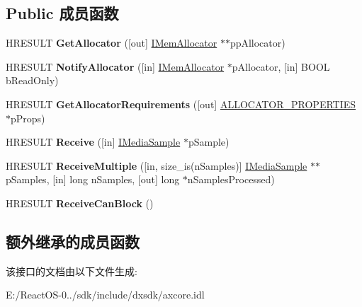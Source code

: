 \subsection*{Public 成员函数}
\begin{DoxyCompactItemize}
\item 
\mbox{\label{interface_i_mem_input_pin_aa7e262cdc9a877d4b41fb8381801115e}} 
H\+R\+E\+S\+U\+LT {\bfseries Get\+Allocator} (\mbox{[}out\mbox{]} \hyperlink{interface_i_mem_allocator}{I\+Mem\+Allocator} $\ast$$\ast$pp\+Allocator)
\item 
\mbox{\label{interface_i_mem_input_pin_a24dafe55e22f2a48f9328abf327162e7}} 
H\+R\+E\+S\+U\+LT {\bfseries Notify\+Allocator} (\mbox{[}in\mbox{]} \hyperlink{interface_i_mem_allocator}{I\+Mem\+Allocator} $\ast$p\+Allocator, \mbox{[}in\mbox{]} B\+O\+OL b\+Read\+Only)
\item 
\mbox{\label{interface_i_mem_input_pin_ae3a1a4054e8a289acf7630225b3a2657}} 
H\+R\+E\+S\+U\+LT {\bfseries Get\+Allocator\+Requirements} (\mbox{[}out\mbox{]} \hyperlink{struct___allocator_properties}{A\+L\+L\+O\+C\+A\+T\+O\+R\+\_\+\+P\+R\+O\+P\+E\+R\+T\+I\+ES} $\ast$p\+Props)
\item 
\mbox{\label{interface_i_mem_input_pin_ad1abc7f53fec3f71e2aacc80124be5ef}} 
H\+R\+E\+S\+U\+LT {\bfseries Receive} (\mbox{[}in\mbox{]} \hyperlink{interface_i_media_sample}{I\+Media\+Sample} $\ast$p\+Sample)
\item 
\mbox{\label{interface_i_mem_input_pin_a48dfdbba7c8a4ee07a08c6796e7c5452}} 
H\+R\+E\+S\+U\+LT {\bfseries Receive\+Multiple} (\mbox{[}in, size\+\_\+is(n\+Samples)\mbox{]} \hyperlink{interface_i_media_sample}{I\+Media\+Sample} $\ast$$\ast$p\+Samples, \mbox{[}in\mbox{]} long n\+Samples, \mbox{[}out\mbox{]} long $\ast$n\+Samples\+Processed)
\item 
\mbox{\label{interface_i_mem_input_pin_a8001fe1cf0ddff4d37fd661e0fcab876}} 
H\+R\+E\+S\+U\+LT {\bfseries Receive\+Can\+Block} ()
\end{DoxyCompactItemize}
\subsection*{额外继承的成员函数}


该接口的文档由以下文件生成\+:\begin{DoxyCompactItemize}
\item 
E\+:/\+React\+O\+S-\/0../sdk/include/dxsdk/axcore.\+idl\end{DoxyCompactItemize}

